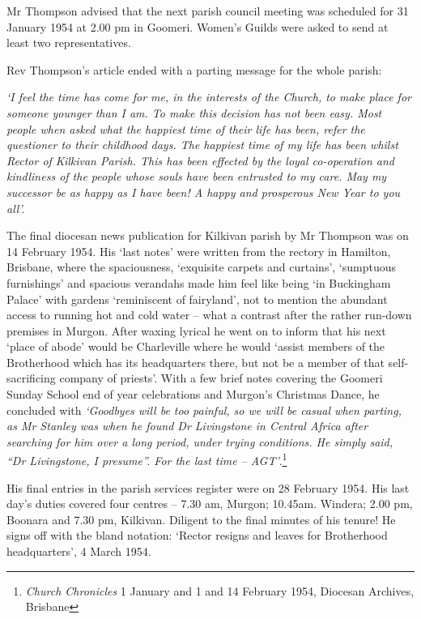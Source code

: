 Mr Thompson advised that the next parish council meeting was scheduled for 31 January 1954 at 2.00 pm in Goomeri. Women's Guilds were asked to send at least two representatives.



Rev Thompson's article ended with a parting message for the whole parish:



\emph{`I feel the time has come for me, in the interests of the Church, to make place for someone younger than I am. To make this decision has not been easy. Most people when asked what the happiest time of their life has been, refer the questioner to their childhood days. The happiest time of my life has been whilst Rector of Kilkivan Parish. This has been effected by the loyal co-operation and kindliness of the people whose souls have been entrusted to my care. May my successor be as happy as I have been! A happy and prosperous New Year to you all'.}



The final diocesan news publication for Kilkivan parish by Mr Thompson was on 14 February 1954. His `last notes' were written from the rectory in Hamilton, Brisbane, where the spaciousness, `exquisite carpets and curtains', `sumptuous furnishings' and spacious verandahs made him feel like being `in Buckingham Palace' with gardens `reminiscent of fairyland', not to mention the abundant access to running hot and cold water -- what a contrast after the rather run-down premises in Murgon. After waxing lyrical he went on to inform that his next `place of abode' would be Charleville where he would `assist members of the Brotherhood which has its headquarters there, but not be a member of that self-sacrificing company of priests'. With a few brief notes covering the Goomeri Sunday School end of year celebrations and Murgon's Christmas Dance, he concluded with \emph{`Goodbyes will be too painful, so we will be casual when parting, as Mr Stanley was when he found Dr Livingstone in Central Africa after searching for him over a long period, under trying conditions. He simply said, ``Dr Livingstone, I presume''. For the last time -- AGT'}.\footnote{\emph{Church Chronicles} 1 January and 1 and 14 February 1954, Diocesan Archives, Brisbane}


His final entries in the parish services register were on 28 February 1954. His last day's duties covered four centres -- 7.30 am, Murgon; 10.45am. Windera; 2.00 pm, Boonara and 7.30 pm, Kilkivan. Diligent to the final minutes of his tenure! He signs off with the bland notation: `Rector resigns and leaves for Brotherhood headquarters', 4 March 1954.



